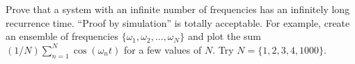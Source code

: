 

Prove that a system with an infinite number of frequencies has an infinitely long recurrence time. ``Proof by simulation'' is totally acceptable. For example, create an ensemble of frequencies $\{\omega_1, \omega_2,\ldots,\omega_N\}$ and plot the sum $(1/N) \sum_{n=1}^N \cos(\omega_n t)$ for a few values of $N$. Try $N=\{1, 2, 3, 4, 1000\}$.
